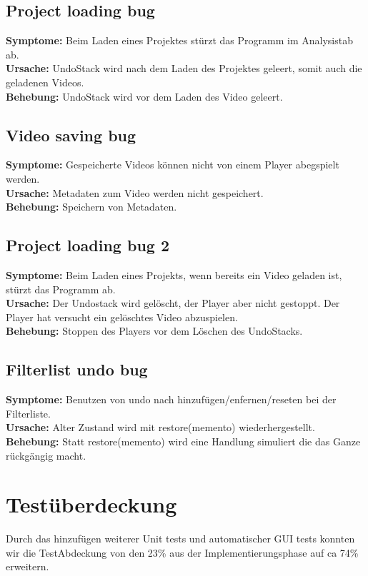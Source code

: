 \documentclass{scrartcl}
\begin{document}
{\subsection{Project loading bug}
\textbf{Symptome:} Beim Laden eines Projektes stürzt das Programm im Analysistab ab.\\
\textbf{Ursache:} UndoStack wird nach dem Laden des Projektes geleert, somit auch die geladenen Videos.\\
\textbf{Behebung:} UndoStack wird vor dem Laden des Video geleert.
\subsection{Video saving bug}
\textbf{Symptome:}
Gespeicherte Videos können nicht von einem Player abegspielt werden.\\
\textbf{Ursache:}
Metadaten zum Video werden nicht gespeichert.\\
\textbf{Behebung:}
Speichern von Metadaten.
\subsection{Project loading bug 2}
\textbf{Symptome:}
Beim Laden eines Projekts, wenn bereits ein Video geladen ist, stürzt das Programm ab.\\
\textbf{Ursache:}
Der Undostack wird gelöscht, der Player aber nicht gestoppt. Der Player hat versucht ein gelöschtes Video abzuspielen.\\
\textbf{Behebung:}
Stoppen des Players vor dem Löschen des UndoStacks.\\
\subsection{Filterlist undo bug}
\textbf{Symptome:}
Benutzen von undo nach hinzufügen/enfernen/reseten bei der Filterliste.\\
\textbf{Ursache:}
Alter Zustand wird mit restore(memento) wiederhergestellt.\\
\textbf{Behebung:}
Statt restore(memento) wird eine Handlung simuliert die das Ganze rückgängig macht.
\newpage
\section{Testüberdeckung}
Durch das hinzufügen weiterer Unit tests und automatischer GUI tests konnten wir die TestAbdeckung von den 23\% aus der Implementierungsphase auf ca 74\% erweitern.
}
\end{document}
